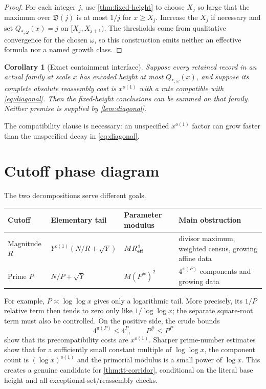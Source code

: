 \documentclass[11pt]{article}
\newtheorem{corollary}[theorem]{Corollary}
\theoremstyle{definition}
\theoremstyle{remark}
\begin{document}
\begin{proof}
For each integer \(j\), use \cref{thm:fixed-height} to choose
\(X_j\) so large that the maximum over \(\mathfrak D(j)\) is at
most \(1/j\) for \(x\ge X_j\).  Increase the \(X_j\) if necessary
and set \(Q_{*,\omega}(x)=j\) on \([X_j,X_{j+1})\).  The thresholds
come from qualitative convergence for the chosen \(\omega\), so
this construction emits neither an effective formula nor a named
growth class.
\end{proof}

\begin{corollary}[Exact containment interface]
\label{cor:containment}
Suppose every retained record in an actual family at scale \(x\)
has encoded height at most \(Q_{*,\omega}(x)\), and suppose its complete
absolute reassembly cost is \(x^{o(1)}\) with a rate compatible
with \eqref{eq:diagonal}.  Then the fixed-height conclusions can be
summed on that family.  Neither premise is supplied by
\cref{lem:diagonal}.
\end{corollary}

The compatibility clause is necessary: an unspecified \(x^{o(1)}\)
factor can grow faster than the unspecified decay in
\eqref{eq:diagonal}.

\section{Cutoff phase diagram}

The two decompositions serve different goals.

\begin{center}
\small
\begin{tabularx}{\textwidth}{@{}
>{\raggedright\arraybackslash}p{}
>{\raggedright\arraybackslash}p{}
>{\raggedright\arraybackslash}p{}
>{\raggedright\arraybackslash}X@{}}
\toprule
Cutoff & Elementary tail & Parameter modulus & Main obstruction\\
\midrule
Magnitude \(R\) &
\(Y^{o(1)}(N/R+\sqrt Y)\) &
\(MR_{\rm eff}^4\) &
divisor maximum, weighted census, growing affine data\\
Prime \(P\) &
\(N/P+\sqrt Y\) &
\(M(P^\#)^2\) &
\(4^{\pi(P)}\) components and growing data\\
\bottomrule
\end{tabularx}
\end{center}

For example, \(P\asymp\log\log x\) gives only a logarithmic tail.
More precisely, its \(1/P\) relative term then tends to zero only
like \(1/\log\log x\); the separate square-root term must also be
controlled.  On the positive side, the crude bounds
\[
 4^{\pi(P)}\le4^P,\qquad P^\#\le P^P
\]
show that its precompatibility costs are \(x^{o(1)}\).  Sharper
prime-number estimates show that for a sufficiently small constant
multiple of \(\log\log x\), the component count is
\((\log x)^{o(1)}\) and the primorial modulus is a small power of
\(\log x\).  This creates a genuine candidate for
\cref{thm:tt-corridor}, conditional on the literal base height and
all exceptional-set/reassembly checks.
\end{document}
